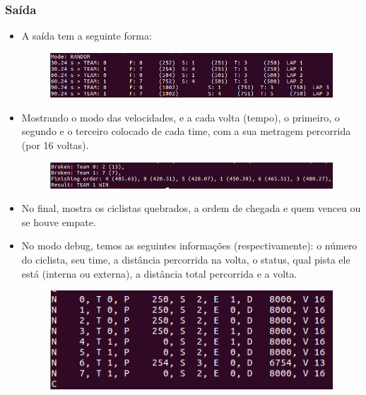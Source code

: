 \documentclass{beamer}
\begin{document}
\begin{frame}
	\frametitle{Saída}
	\begin{itemize}
		\item A saída tem a seguinte forma:
		\begin{figure}[!h]
			\centering
			\includegraphics[scale=0.4]{5-a.png}
		\end{figure}
		\item Mostrando o modo das velocidades, e a cada volta (tempo), o primeiro, o segundo e o terceiro colocado de cada time, com a sua metragem percorrida (por 16 voltas).
		\begin{figure}[!h]
			\centering
			\includegraphics[scale=0.4]{5-b.png}
		\end{figure}
		\item No final, mostra os ciclistas quebrados, a ordem de chegada e quem venceu ou se houve empate.
	\end{itemize}
\end{frame}
	
\begin{frame}
	\begin{itemize}
		\item No modo debug, temos as seguintes informações (respectivamente): o número do ciclista, seu time, a distância percorrida na volta, o status, qual pista ele está (interna ou externa), a distância total percorrida e a volta.
		\begin{figure}[!h]
			\centering
			\includegraphics[scale=0.5]{6.png}
		\end{figure}
	\end{itemize}
\end{frame}
\end{document}
